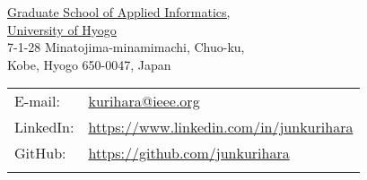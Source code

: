 {\Huge \name}


\vspace{0.25in}

\begin{minipage}{0.45\linewidth}
  \href{https://www.ai.u-hyogo.ac.jp/index.html}{Graduate School of Applied Informatics,\\ University of Hyogo} \\
  7-1-28 Minatojima-minamimachi, Chuo-ku, \\
  Kobe, Hyogo 650-0047, Japan
\end{minipage}
\begin{minipage}{0.45\linewidth}
  \begin{tabular}{ll}
    E-mail: & \href{mailto:kurihara@ieee.org}{kurihara@ieee.org} \\
    LinkedIn: & \href{https://www.linkedin.com/in/junkurihara}{https://www.linkedin.com/in/junkurihara}\\
    GitHub: & \href{https://github.com/junkurihara}{https://github.com/junkurihara}\\
    &\\
  \end{tabular}
\end{minipage}




